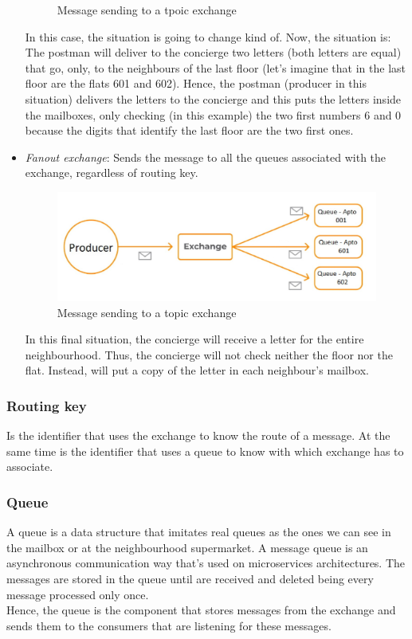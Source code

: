 \documentclass[12pt]{article}
\begin{document}
\begin{itemize}
\begin{figure}[H]
        \caption{Message sending to a tpoic exchange}
        \label{fig:topic_exchange}
    \end{figure}
    In this case, the situation is going to change kind of. Now, the situation is: The postman will deliver to the concierge two letters (both letters are equal) that go, only, to the neighbours of the last floor (let's imagine that in the last floor are the flats 601 and 602). Hence, the postman (producer in this situation) delivers the letters to the concierge and this puts the letters inside the mailboxes, only checking (in this example) the two first numbers 6 and 0 because the digits that identify the last floor are the two first ones.
    \item \textit{Fanout exchange}: Sends the message to all the queues associated with the exchange, regardless of routing key.
    \begin{figure}[H]
        \centering
        \includegraphics[scale = 0.4]{Images/fanout_exchange.jpg}
        \caption{Message sending to a topic exchange}
        \label{fig:fanout_exchange}
    \end{figure}
    \newpage
    In this final situation, the concierge will receive a letter for the entire neighbourhood. Thus, the concierge will not check neither the floor nor the flat. Instead, will put a copy of the letter in each neighbour's mailbox.
\end{itemize}

\subsubsection*{Routing key}
Is the identifier that uses the exchange to know the route of a message. At the same time is the identifier that uses a queue to know with which exchange has to associate.

\subsubsection*{Queue}
A queue is a data structure that imitates real queues as the ones we can see in the mailbox or at the neighbourhood supermarket.
A message queue is an asynchronous communication way that's used on microservices architectures. The messages are stored in the queue until are received and deleted being every message processed only once.\\
Hence, the queue is the component that stores messages from the exchange and sends them to the consumers that are listening for these messages.
\end{document}
